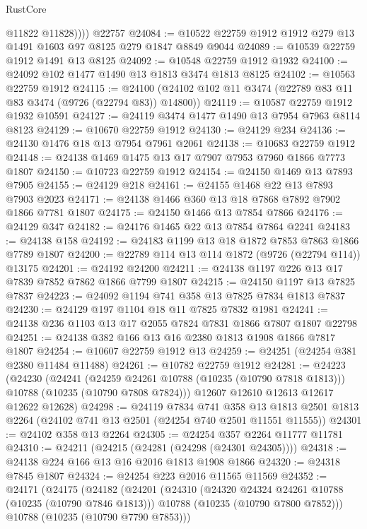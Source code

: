 \begin{lexlean}{RustCore}
\begin{coremodule}
            @11822
            @11828))))
    @22757
@24084 := @10522 @22759 @1912 @1912 @279 @13 @1491 @1603 @97 @8125 @279 @1847 @8849 @9044
@24089 := @10539 @22759 @1912 @1491 @13 @8125
@24092 := @10548 @22759 @1912 @1932
@24100 := @24092 @102 @1477 @1490 @13 @1813 @3474 @1813 @8125
@24102 := @10563 @22759 @1912
@24115 := @24100 (@24102 @102 @11 @3474 (@22789 @83 @11 @83 @3474 (@9726 (@22794 @83)) @14800))
@24119 := @10587 @22759 @1912 @1932 @10591
@24127 := @24119 @3474 @1477 @1490 @13 @7954 @7963 @8114 @8123
@24129 := @10670 @22759 @1912
@24130 := @24129 @234
@24136 := @24130 @1476 @18 @13 @7954 @7961 @2061
@24138 := @10683 @22759 @1912
@24148 := @24138 @1469 @1475 @13 @17 @7907 @7953 @7960 @1866 @7773 @1807
@24150 := @10723 @22759 @1912
@24154 := @24150 @1469 @13 @7893 @7905
@24155 := @24129 @218
@24161 := @24155 @1468 @22 @13 @7893 @7903 @2023
@24171 := @24138 @1466 @360 @13 @18 @7868 @7892 @7902 @1866 @7781 @1807
@24175 := @24150 @1466 @13 @7854 @7866
@24176 := @24129 @347
@24182 := @24176 @1465 @22 @13 @7854 @7864 @2241
@24183 := @24138 @158
@24192 := @24183 @1199 @13 @18 @1872 @7853 @7863 @1866 @7789 @1807
@24200 := @22789 @114 @13 @114 @1872 (@9726 (@22794 @114)) @13175
@24201 := @24192 @24200
@24211 := @24138 @1197 @226 @13 @17 @7839 @7852 @7862 @1866 @7799 @1807
@24215 := @24150 @1197 @13 @7825 @7837
@24223 := @24092 @1194 @741 @358 @13 @7825 @7834 @1813 @7837
@24230 := @24129 @197 @1104 @18 @11 @7825 @7832 @1981
@24241 := @24138 @236 @1103 @13 @17 @2055 @7824 @7831 @1866 @7807 @1807 @22798
@24251 := @24138 @382 @166 @13 @16 @2380 @1813 @1908 @1866 @7817 @1807
@24254 := @10607 @22759 @1912 @13
@24259 := @24251 (@24254 @381 @2380 @11484 @11488)
@24261 := @10782 @22759 @1912
@24281 := @24223
    (@24230
      (@24241
        (@24259 @24261 @10788 (@10235 (@10790 @7818 @1813)))
        @10788
        (@10235 (@10790 @7808 @7824)))
      @12607
      @12610
      @12613
      @12617
      @12622
      @12628)
@24298 := @24119
    @7834
    @741
    @358
    @13
    @1813
    @2501
    @1813
    @2264
    (@24102 @741 @13 @2501 (@24254 @740 @2501 @11551 @11555))
@24301 := @24102 @358 @13 @2264
@24305 := @24254 @357 @2264 @11777 @11781
@24310 := @24211 (@24215 (@24281 (@24298 (@24301 @24305))))
@24318 := @24138 @224 @166 @13 @16 @2016 @1813 @1908 @1866
@24320 := @24318 @7845 @1807
@24324 := @24254 @223 @2016 @11565 @11569
@24352 := @24171
    (@24175
      (@24182
        (@24201
          (@24310
            (@24320 @24324 @24261 @10788 (@10235 (@10790 @7846 @1813)))
            @10788
            (@10235 (@10790 @7800 @7852)))
          @10788
          (@10235 (@10790 @7790 @7853)))

\end{coremodule}
\end{lexlean}
